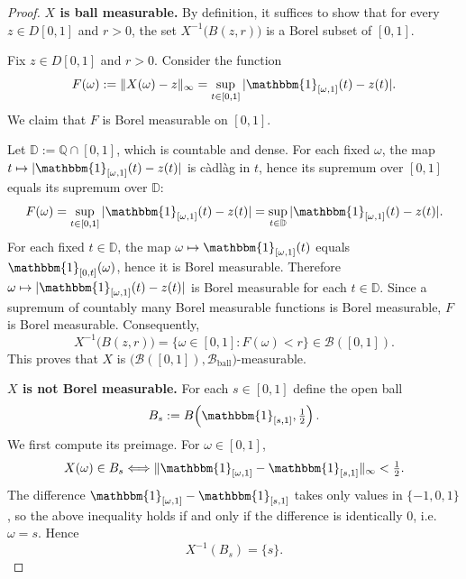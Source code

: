 \documentclass[12pt]{article}
\renewcommand{\(}{\left(}%
\renewcommand{\)}{\right)}%
\renewcommand{\[}{\left[}%
\renewcommand{\]}{\right]}%
\newtheorem{proof}{Proof.}}
\begin{document}
\begin{proof}
{\bfseries $X$ is ball measurable.} 
By definition, it suffices to show that for every $z\in D[0,1]$ and $r>0$,
the set $X^{-1}\big(B(z,r)\big)$ is a Borel subset of $[0,1]$.

Fix $z\in D[0,1]$ and $r>0$. Consider the function
\begin{equation*}
F(\omega):=\|X(\omega)-z\|_\infty=\sup_{t\in[0,1]}|\mathbbm{1}_{[\omega,1]}(t)-z(t)|.
\end{equation*}
We claim that $F$ is Borel measurable on $[0,1]$.

Let $\mathbb D:=\mathbb Q\cap[0,1]$, which is countable and dense. For each fixed $\omega$,
the map $t\mapsto |\mathbbm{1}_{[\omega,1]}(t)-z(t)|$ is c\`adl\`ag in $t$, hence its supremum
over $[0,1]$ equals its supremum over $\mathbb D$:
\begin{equation*}
F(\omega)=\sup_{t\in[0,1]}|\mathbbm{1}_{[\omega,1]}(t)-z(t)|
=\sup_{t\in\mathbb D}|\mathbbm{1}_{[\omega,1]}(t)-z(t)|.
\end{equation*}
For each fixed $t\in\mathbb D$, the map $\omega\mapsto \mathbbm{1}_{[\omega,1]}(t)$ equals
$\mathbbm{1}_{[0,t]}(\omega)$, hence it is Borel measurable. Therefore
$\omega\mapsto |\mathbbm{1}_{[\omega,1]}(t)-z(t)|$ is Borel measurable for each $t\in\mathbb D$.
Since a supremum of countably many Borel measurable functions is Borel measurable, $F$ is
Borel measurable. Consequently,
\begin{equation*}
X^{-1}\big(B(z,r)\big)=\{\omega\in[0,1]:F(\omega)<r\}\in\mathcal B([0,1]).
\end{equation*}
This proves that $X$ is $\big(\mathcal B([0,1]),\mathcal B_{\mathrm{ball}}\big)$-measurable.

\medskip
\noindent\textbf{$X$ is not Borel measurable.}
For each $s\in[0,1]$ define the open ball
\begin{equation*}
B_s:=B\!\left(\mathbbm{1}_{[s,1]},\tfrac12\right).
\end{equation*}
We first compute its preimage. For $\omega\in[0,1]$,
\begin{equation*}
X(\omega)\in B_s
\Longleftrightarrow
\|\mathbbm{1}_{[\omega,1]}-\mathbbm{1}_{[s,1]}\|_\infty<\tfrac12.
\end{equation*}
The difference $\mathbbm{1}_{[\omega,1]}-\mathbbm{1}_{[s,1]}$ takes only values in $\{-1,0,1\}$,
so the above inequality holds if and only if the difference is identically $0$, i.e.\ $\omega=s$.
Hence
\begin{equation*}
X^{-1}(B_s)=\{s\}.
\end{equation*}


\end{proof}
\end{document}
